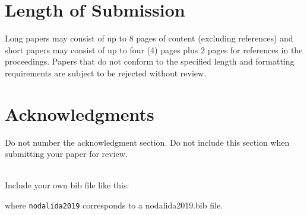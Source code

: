 \documentclass[11pt]{article}
\begin{document}
\section{Length of Submission}
\label{sec:length}

Long papers may consist of up to 8 pages of content (excluding
references) and short papers may consist of up to 
four (4) pages plus 2 pages for references in the proceedings.  Papers that do not conform to the
specified length and formatting requirements are subject to be
rejected without review.

\section*{Acknowledgments}

Do not number the acknowledgment section. Do not include this section
when submitting your paper for review.

 \\
Include your own bib file like this:
\verb||
\verb|| 

where \verb|nodalida2019| corresponds to a nodalida2019.bib file.





\end{document}
